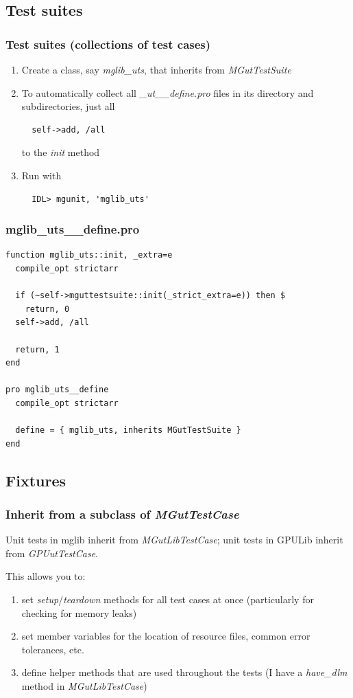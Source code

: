 \documentclass[12pt, handout]{beamer}
\begin{document}
\subsection{Test suites}

\begin{frame}[t, fragile]
  \hypertarget{suites}{}
  \frametitle{Test suites (collections of test cases)}
  \begin{enumerate}
    \item Create a class, say {\em mglib\_uts}, that inherits from {\em MGutTestSuite}
    \item To automatically collect all {\em \_ut\_\_define.pro} files in its directory and subdirectories, just all
\begin{lstlisting}
  self->add, /all
\end{lstlisting}
to the {\em init} method
    \item Run with
\begin{lstlisting}
  IDL> mgunit, 'mglib_uts'
\end{lstlisting}
  \end{enumerate}
\end{frame}

\begin{frame}[fragile]
  \frametitle{mglib\_uts\_\_define.pro}
\begin{lstlisting}[basicstyle=\ttfamily\fontsize{10pt}{10pt}\selectfont]
function mglib_uts::init, _extra=e
  compile_opt strictarr

  if (~self->mguttestsuite::init(_strict_extra=e)) then $
    return, 0
  self->add, /all

  return, 1
end

pro mglib_uts__define
  compile_opt strictarr

  define = { mglib_uts, inherits MGutTestSuite }
end
\end{lstlisting}
\end{frame}

\subsection{Fixtures}

\begin{frame}
  \frametitle{Inherit from a subclass of {\em MGutTestCase}}
Unit tests in mglib inherit from {\em MGutLibTestCase}; unit tests in GPULib inherit from {\em GPUutTestCase}.

This allows you to:
\begin{enumerate}
  \item set {\em setup}/{\em teardown} methods for all test cases at once (particularly for checking for memory leaks)
  \item set member variables for the location of resource files, common error tolerances, etc.
  \item define helper methods that are used throughout the tests (I have a {\em have\_dlm} method in {\em MGutLibTestCase})
\end{enumerate}
\end{frame}
\end{document}
